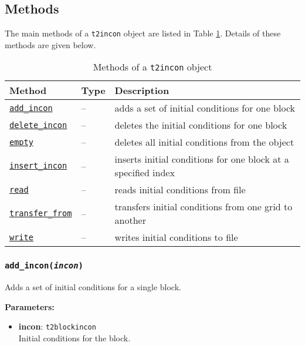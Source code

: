 \subsection{Methods}

The main methods of a \texttt{t2incon} object are listed in Table \ref{tb:t2incon_methods}.  Details of these methods are given below.

\begin{table}
  \begin{center}
    \begin{tabular}{|l|l|p{65mm}|}
      \hline
      \textbf{Method} & \textbf{Type} & \textbf{Description}\\
      \hline
      \hyperref[sec:t2incon:add_incon]{\texttt{add\_incon}} & -- & adds a set of initial conditions for one block\\
      \hyperref[sec:t2incon:delete_incon]{\texttt{delete\_incon}} & -- & deletes the initial conditions for one block\\
      \hyperref[sec:t2incon:empty]{\texttt{empty}} & -- & deletes all initial conditions from the object\\
      \hyperref[sec:t2incon:insert_incon]{\texttt{insert\_incon}} & -- & inserts initial conditions for one block at a specified index\\
      \hyperref[sec:t2incon:read]{\texttt{read}} & -- & reads initial conditions from file\\
      \hyperref[sec:t2incon:transfer_from]{\texttt{transfer\_from}} & -- & transfers initial conditions from one grid to another\\
      \hyperref[sec:t2incon:write]{\texttt{write}} & -- & writes initial conditions to file\\
      \hline
    \end{tabular}
    \caption{Methods of a \texttt{t2incon} object}
    \label{tb:t2incon_methods}
  \end{center}
\end{table}

\begin{snugshade}
\subsubsection{\texttt{add\_incon(\emph{incon})}}
\end{snugshade}
\label{sec:t2incon:add_incon}

Adds a set of initial conditions for a single block.

\textbf{Parameters:}
\begin{itemize}
\item \textbf{incon}: \texttt{t2blockincon}\\
  Initial conditions for the block.
\end{itemize}

